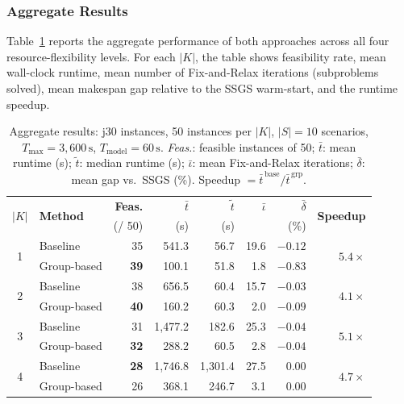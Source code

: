 \subsubsection*{Aggregate Results}
Table~\ref{tab:j30_summary} reports the aggregate performance
of both approaches across all four resource-flexibility levels.
For each $|K|$, the table shows feasibility rate, mean
wall-clock runtime, mean number of Fix-and-Relax iterations
(subproblems solved), mean makespan gap relative to the SSGS
warm-start, and the runtime speedup.
\begin{table}[htbp]
\centering
\renewcommand{\arraystretch}{1.35}
\caption{Aggregate results: j30 instances, 50 instances per $|K|$,
         $|S|=10$ scenarios, $T_{\max}=3{,}600\,\text{s}$,
         $T_{\mathrm{model}}=60\,\text{s}$.
         \emph{Feas.}: feasible instances of 50;
         $\bar{t}$: mean runtime (s);
         $\tilde{t}$: median runtime (s);
         $\bar{\iota}$: mean Fix-and-Relax iterations;
         $\bar{\delta}$: mean gap vs.\ SSGS (\%).
         Speedup $= \bar{t}^{\,\mathrm{base}} /
         \bar{t}^{\,\mathrm{grp}}$.}
\label{tab:j30_summary}
\begin{tabular}{c l r r r r r r}
\hline
\multirow{2}{*}{$|K|$} &
\multirow{2}{*}{\textbf{Method}} &
\textbf{Feas.} &
$\bar{t}$ &
$\tilde{t}$ &
$\bar{\iota}$ &
$\bar{\delta}$ &
\multirow{2}{*}{\textbf{Speedup}} \\
& & (/ 50) & (s) & (s) & & (\%) & \\
\hline
\multirow{2}{*}{1}
  & Baseline    & 35 & 541.3 &  56.7 & 19.6 & $-0.12$ & \multirow{2}{*}{$5.4\times$} \\
  & Group-based & \textbf{39} & 100.1 &  51.8 &  1.8 & $-0.83$ & \\
\hline
\multirow{2}{*}{2}
  & Baseline    & 38 & 656.5 &  60.4 & 15.7 & $-0.03$ & \multirow{2}{*}{$4.1\times$} \\
  & Group-based & \textbf{40} & 160.2 &  60.3 &  2.0 & $-0.09$ & \\
\hline
\multirow{2}{*}{3}
  & Baseline    & 31 & 1{,}477.2 & 182.6 & 25.3 & $-0.04$ & \multirow{2}{*}{$5.1\times$} \\
  & Group-based & \textbf{32} &   288.2 &  60.5 &  2.8 & $-0.04$ & \\
\hline
\multirow{2}{*}{4}
  & Baseline    & \textbf{28} & 1{,}746.8 & 1{,}301.4 & 27.5 & $0.00$ & \multirow{2}{*}{$4.7\times$} \\
  & Group-based & 26 &   368.1 &   246.7 &  3.1 & $0.00$ & \\
\hline
\end{tabular}
\end{table}
